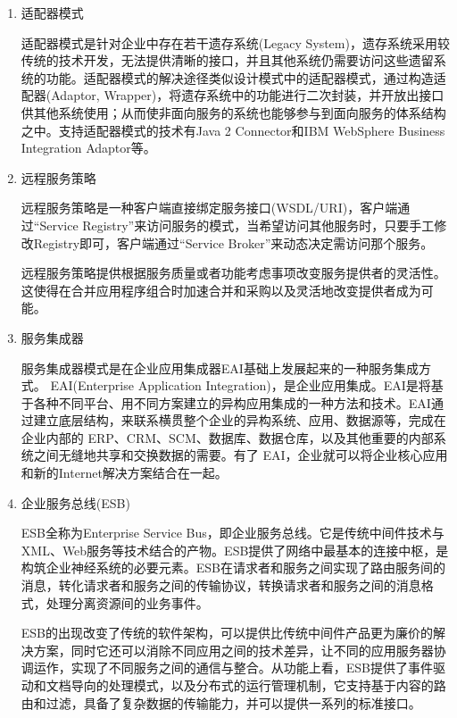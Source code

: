 \documentclass[11pt,a4paper]{article}
\begin{document}
\begin{CJK}{UTF8}{gbsn}
\begin{enumerate}
\item 适配器模式

	适配器模式是针对企业中存在若干遗存系统(Legacy System)，遗存系统采用较传统的技术开发，无法提供清晰的接口，并且其他系统仍需要访问这些遗留系统的功能。适配器模式的解决途径类似设计模式中的适配器模式，通过构造适配器(Adaptor, Wrapper)，将遗存系统中的功能进行二次封装，并开放出接口供其他系统使用；从而使非面向服务的系统也能够参与到面向服务的体系结构之中。支持适配器模式的技术有Java 2 Connector和IBM WebSphere Business Integration Adaptor等。
	
	
\item 远程服务策略

    远程服务策略是一种客户端直接绑定服务接口(WSDL/URI)，客户端通过“Service Registry”来访问服务的模式，当希望访问其他服务时，只要手工修改Registry即可，客户端通过“Service Broker”来动态决定需访问那个服务。
	
	远程服务策略提供根据服务质量或者功能考虑事项改变服务提供者的灵活性。这使得在合并应用程序组合时加速合并和采购以及灵活地改变提供者成为可能。
	
\item 服务集成器

    服务集成器模式是在企业应用集成器EAI基础上发展起来的一种服务集成方式。
     EAI(Enterprise Application Integration)，是企业应用集成。EAI是将基于各种不同平台、用不同方案建立的异构应用集成的一种方法和技术。EAI通过建立底层结构，来联系横贯整个企业的异构系统、应用、数据源等，完成在企业内部的 ERP、CRM、SCM、数据库、数据仓库，以及其他重要的内部系统之间无缝地共享和交换数据的需要。有了 EAI，企业就可以将企业核心应用和新的Internet解决方案结合在一起。
     
\item 企业服务总线(ESB)

    ESB全称为Enterprise Service Bus，即企业服务总线。它是传统中间件技术与XML、Web服务等技术结合的产物。ESB提供了网络中最基本的连接中枢，是构筑企业神经系统的必要元素。ESB在请求者和服务之间实现了路由服务间的消息，转化请求者和服务之间的传输协议，转换请求者和服务之间的消息格式，处理分离资源间的业务事件。
    
    ESB的出现改变了传统的软件架构，可以提供比传统中间件产品更为廉价的解决方案，同时它还可以消除不同应用之间的技术差异，让不同的应用服务器协调运作，实现了不同服务之间的通信与整合。从功能上看，ESB提供了事件驱动和文档导向的处理模式，以及分布式的运行管理机制，它支持基于内容的路由和过滤，具备了复杂数据的传输能力，并可以提供一系列的标准接口。
    
\end{enumerate}


\end{CJK}
\end{document}
